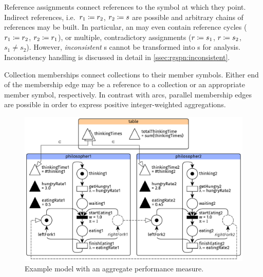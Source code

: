 Reference assignments connect references to the symbol at which they point. Indirect references, i.e.~\(r_1 \coloneq r_2\), \(r_2 \coloneq s\) are possible and arbitrary chains of references may be built. In particular, an  may even contain reference cycles (\(r_1 \coloneq r_2\), \(r_2 \coloneq r_1\)), or multiple, contradictory assignments (\(r \coloneq s_1\), \(r \coloneq s_2\), \(s_1 \ne s_2\)). However, \emph{inconsistent} s cannot be transformed into s for analysis. Inconsistency handling is discussed in detail in \vref{ssec:rgspn:inconsistent}.

Collection memberships connect collections to their member symbols. Either end of the membership edge may be a reference to a collection or an appropriate member symbol, respectively. In contrast with arcs, parallel membership edges are possible in order to express positive integer-weighted aggregations.

\begin{figure}
  \centering
  \includegraphics[scale=0.9]{figures/rgspn_example}
  \caption{Example  model with an aggregate performance measure.}
  \label{fig:rgspn:example}
\end{figure}

